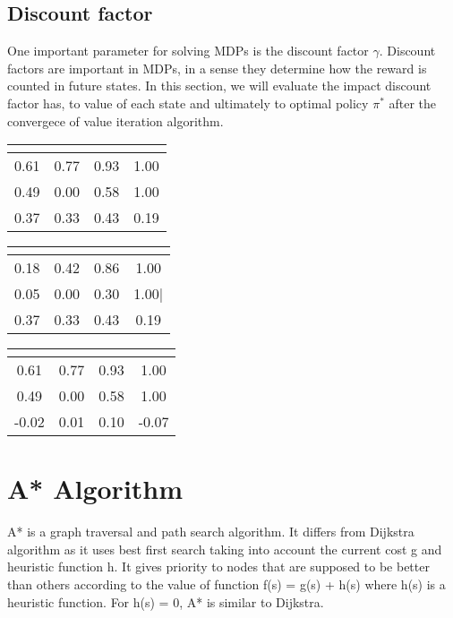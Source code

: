 \documentclass[10pt,a4paper,twocolumn]{article}
\begin{document}
	
	\subsection{Discount factor}
	 One  important parameter for solving  MDPs is the discount factor $\gamma$. Discount factors are important in MDPs, in a sense they determine how the reward is counted in future states.
	 In this section, we will evaluate the impact discount factor has, to value of each state and ultimately to optimal policy $\pi^{*} $ after the convergece of value iteration algorithm.
	 
	\begin{center}
		\begin{tabular}{ c c c c}
			 \hline
			\multicolumn{4}{|c|}{  \text{$\gamma = 0.9$} } \\
			\hline
			0.61  & 0.77  & 0.93 & 1.00 \\ 
			0.49  & 0.00  & 0.58  & 1.00 \\  
			0.37 &  0.33 & 0.43 & 0.19    
		\end{tabular}
	\end{center}
	
	
		\begin{center}
		\begin{tabular}{ c c c c}
						 \hline
			\multicolumn{4}{|c|}{  \text{$\gamma = 0.6$} } \\
			\hline
			0.18 & 0.42 & 0.86 &1.00 \\ 
			0.05 & 0.00 & 0.30 & 1.00|  \\  
			0.37 &  0.33 & 0.43 & 0.19    
		\end{tabular}
	\end{center}


	\begin{center}
	\begin{tabular}{ c c c c}
					 \hline
		\multicolumn{4}{|c|}{  \text{$\gamma = 0.2$} } \\
		\hline
		0.61  & 0.77  & 0.93 & 1.00 \\ 
		0.49  & 0.00  & 0.58  & 1.00 \\  
		-0.02 & 0.01 &  0.10 & -0.07
	\end{tabular}
\end{center}




	\section{A* Algorithm}
	A* is a graph traversal and path search algorithm. It differs from Dijkstra algorithm as it uses best first search taking into account the current cost g and heuristic function h. It gives priority to nodes that are supposed to be better than others according to the value of function f(s) = g(s) + h(s) where h(s) is a heuristic function. For h(s) = 0, A* is similar to Dijkstra.
\end{document}
